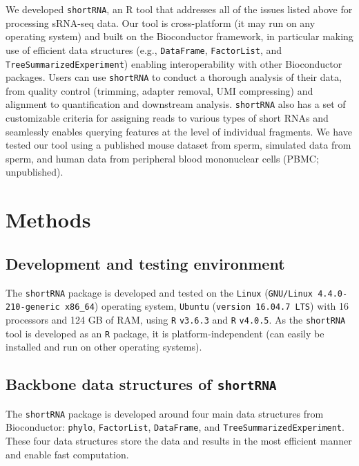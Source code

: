 \documentclass[12pt,twoside]{reedthesis}
\begin{document}
We developed \texttt{shortRNA}, an R tool that addresses all of the issues
listed above for processing sRNA-seq data. Our tool is cross-platform
(it may run on any operating system) and built on the Bioconductor
framework, in particular making use of efficient data structures (e.g.,
\texttt{DataFrame}, \texttt{FactorList}, and \texttt{TreeSummarizedExperiment}) enabling
interoperability with other Bioconductor packages. Users can use
\texttt{shortRNA} to conduct a thorough analysis of their data, from quality
control (trimming, adapter removal, UMI compressing) and alignment to
quantification and downstream analysis. \texttt{shortRNA} also has a set of
customizable criteria for assigning reads to various types of short RNAs
and seamlessly enables querying features at the level of individual
fragments. We have tested our tool using a published mouse dataset from
sperm, simulated data from sperm, and human data from peripheral blood
mononuclear cells (PBMC; unpublished).

\hypertarget{methods-2}{%
\section{Methods}\label{methods-2}}

\hypertarget{development-and-testing-environment}{%
\subsection{Development and testing environment}\label{development-and-testing-environment}}

The \texttt{shortRNA} package is developed and tested on the \texttt{Linux}
(\texttt{GNU/Linux\ 4.4.0-210-generic\ x86\_64}) operating system, \texttt{Ubuntu}
(\texttt{version\ 16.04.7\ LTS}) with 16 processors and 124 GB of RAM, using \texttt{R}
\texttt{v3.6.3} and \texttt{R} \texttt{v4.0.5}. As the \texttt{shortRNA} tool is developed as an \texttt{R}
package, it is platform-independent (can easily be installed and run on
other operating systems).

\hypertarget{backbone-data-structures-of-shortrna}{%
\subsection{\texorpdfstring{Backbone data structures of \texttt{shortRNA}}{Backbone data structures of shortRNA}}\label{backbone-data-structures-of-shortrna}}

The \texttt{shortRNA} package is developed around four main data structures
from Bioconductor: \texttt{phylo}, \texttt{FactorList}, \texttt{DataFrame}, and
\texttt{TreeSummarizedExperiment}. These four data structures store the data
and results in the most efficient manner and enable fast computation.
\end{document}
